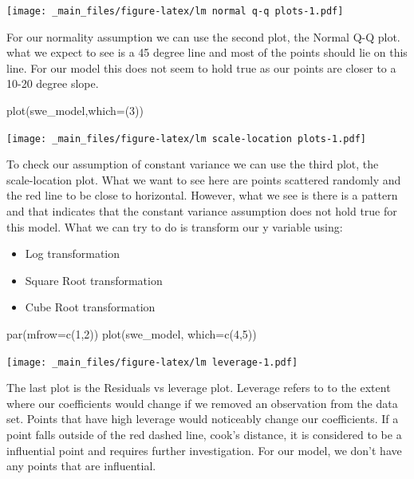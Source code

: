 \documentclass[
]{book}
\newenvironment{Shaded}{\begin{snugshade}}{\end{snugshade}}
\newcommand{\AttributeTok}[1]{\textcolor[rgb]{0.77,0.63,0.00}{#1}}
\newcommand{\DecValTok}[1]{\textcolor[rgb]{0.00,0.00,0.81}{#1}}
\newcommand{\FunctionTok}[1]{\textcolor[rgb]{0.00,0.00,0.00}{#1}}
\newcommand{\NormalTok}[1]{#1}
\begin{document}
\texttt{[image: \_main\_files/figure-latex/lm normal q-q plots-1.pdf]}

For our normality assumption we can use the second plot, the Normal Q-Q plot. what we expect to see is a 45 degree line and most of the points should lie on this line. For our model this does not seem to hold true as our points are closer to a 10-20 degree slope.

\begin{Shaded}
\begin{Highlighting}[]
\FunctionTok{plot}\NormalTok{(swe\_model,}\AttributeTok{which=}\NormalTok{(}\DecValTok{3}\NormalTok{))}
\end{Highlighting}
\end{Shaded}

\texttt{[image: \_main\_files/figure-latex/lm scale-location plots-1.pdf]}

To check our assumption of constant variance we can use the third plot, the scale-location plot. What we want to see here are points scattered randomly and the red line to be close to horizontal. However, what we see is there is a pattern and that indicates that the constant variance assumption does not hold true for this model. What we can try to do is transform our y variable using:

\begin{itemize}
\item
  Log transformation
\item
  Square Root transformation
\item
  Cube Root transformation
\end{itemize}

\begin{Shaded}
\begin{Highlighting}[]
\FunctionTok{par}\NormalTok{(}\AttributeTok{mfrow=}\FunctionTok{c}\NormalTok{(}\DecValTok{1}\NormalTok{,}\DecValTok{2}\NormalTok{))}
\FunctionTok{plot}\NormalTok{(swe\_model, }\AttributeTok{which=}\FunctionTok{c}\NormalTok{(}\DecValTok{4}\NormalTok{,}\DecValTok{5}\NormalTok{))}
\end{Highlighting}
\end{Shaded}

\texttt{[image: \_main\_files/figure-latex/lm leverage-1.pdf]}

The last plot is the Residuals vs leverage plot. Leverage refers to to the extent where our coefficients would change if we removed an observation from the data set. Points that have high leverage would noticeably change our coefficients. If a point falls outside of the red dashed line, cook's distance, it is considered to be a influential point and requires further investigation. For our model, we don't have any points that are influential.
\end{document}
